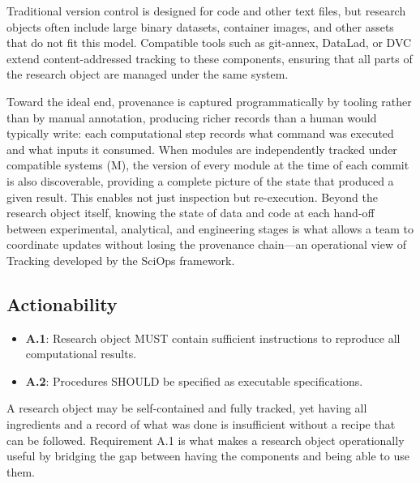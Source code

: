 \documentclass{article}
\makeatletter
\newcommand{\hyanchor}[1]{\texorpdfstring{\Hy@raisedlink{\hypertarget{#1}{}}}{}}
\newcommand{\anchoredsubsection}[2]{\subsection[#2]{\hyanchor{#1}#2}}
\makeatother
\begin{document}
Traditional version control is designed for code and other text files, but research objects often include large binary datasets, container images, and other assets that do not fit this model.
Compatible tools such as git-annex, DataLad, or DVC extend content-addressed tracking to these components, ensuring that all parts of the research object are managed under the same system.

Toward the ideal end, provenance is captured programmatically by tooling rather than by manual annotation, producing richer records than a human would typically write: each computational step records what command was executed and what inputs it consumed.
When modules are independently tracked under compatible systems (M), the version of every module at the time of each commit is also discoverable, providing a complete picture of the state that produced a given result.
This enables not just inspection but re-execution.
Beyond the research object itself, knowing the state of data and code at each hand-off between experimental, analytical, and engineering stages is what allows a team to coordinate updates without losing the provenance chain---an operational view of Tracking developed by the SciOps framework\cite{johnson_sciops_2024}.



\anchoredsubsection{actionability}{Actionability}

\begin{itemize}
    \item \textbf{A.1}: Research object MUST contain sufficient instructions to reproduce all computational results.
    \item \textbf{A.2}: Procedures SHOULD be specified as executable specifications.
\end{itemize}

A research object may be self-contained and fully tracked, yet having all ingredients and a record of what was done is insufficient without a recipe that can be followed.
Requirement A.1 is what makes a research object operationally useful by bridging the gap between having the components and being able to use them.
\end{document}
